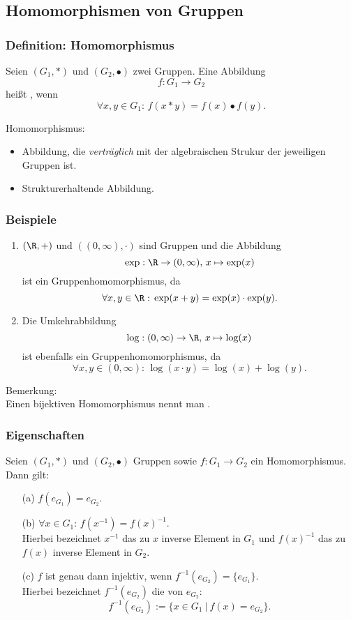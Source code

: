 \subsection{Homomorphismen von Gruppen}
%
\begin{frame}\frametitle{Definition: Homomorphismus}
	
	Seien $(G_1,\ast)$ und $(G_2, \bullet)$ zwei Gruppen. Eine Abbildung 
	$$
		f: G_1 \to G_2
	$$ 
	hei{\ss}t , wenn
	$$
		\forall x,y \in G_1:\, f(x\ast y) = f(x)\bullet f(y).
	$$
	
	\pause
	\vfill
	Homomorphismus: 
	\begin{itemize}
		\item Abbildung, die {\em verträglich} mit der algebraischen Strukur der jeweiligen Gruppen ist.
		\item Strukturerhaltende Abbildung.
	\end{itemize}

\end{frame}
%
%
\begin{frame}\frametitle{Beispiele}
	
	\begin{enumerate}
		\item $(\R,+)$ und $( (0,\infty),\cdot)$ sind Gruppen und die Abbildung
			$$
				\exp: \R \to (0,\infty),\, x\mapsto \exp(x)
			$$
			ist ein Gruppenhomomorphismus, da
			$$
				\forall x,y \in\R:\, \exp(x+y) = \exp(x)\cdot\exp(y).
			$$
		\pause
		\item Die Umkehrabbildung
			$$
				\log: (0,\infty) \to \R,\, x\mapsto \log(x)
			$$
			ist ebenfalls ein Gruppenhomomorphismus, da
			$$
				\forall x,y\in (0,\infty):\, \log(x \cdot y) = \log(x) + \log(y).
			$$
	\end{enumerate}
	
	\vfill
	\pause
	Bemerkung:\\
	Einen bijektiven Homomorphismus nennt man .
	
\end{frame}
%
%
\begin{frame}\frametitle{Eigenschaften}

	Seien $(G_1,\ast)$ und $(G_2,\bullet)$ Gruppen sowie $f: G_1\to G_2$ ein Homomorphismus.
	Dann gilt:
	\begin{itemize}
		\item[(a)] $f(e_{G_1}) = e_{G_2}$. \pause
		\item[(b)] $\forall x\in G_1:\, f(x^{-1}) = f(x)^{-1}$.\\
				Hierbei bezeichnet $x^{-1}$ das zu $x$ inverse Element in $G_1$ und  $f(x)^{-1}$ das zu $f(x)$ inverse Element in $G_2$.\pause
		\item[(c)] $f$ ist genau dann injektiv, wenn $f^{-1}(e_{G_2}) = \{e_{G_1}\}$.\\
			Hierbei bezeichnet $f^{-1}(e_{G_2})$ die  von $e_{G_2}$:
			$$
				f^{-1}(e_{G_2}) := \{x\in G_1~|~ f(x) = e_{G_2} \}.
			$$
	\end{itemize} 
	
\end{frame}
